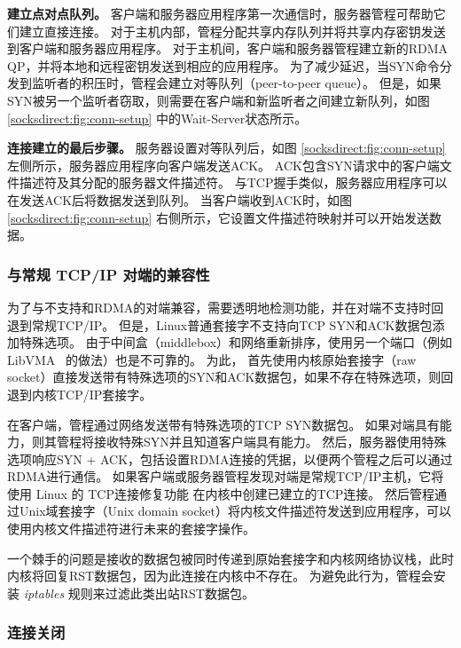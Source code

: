 \textbf {建立点对点队列。}
客户端和服务器应用程序第一次通信时，服务器管程可帮助它们建立直接连接。
对于主机内部，管程分配共享内存队列并将共享内存密钥发送到客户端和服务器应用程序。
对于主机间，客户端和服务器管程建立新的RDMA QP，并将本地和远程密钥发送到相应的应用程序。
为了减少延迟，当SYN命令分发到监听者的积压时，管程会建立对等队列（peer-to-peer queue）。
但是，如果SYN被另一个监听者窃取，则需要在客户端和新监听者之间建立新队列，如图 \ref {socksdirect:fig:conn-setup} 中的Wait-Server状态所示。

\textbf {连接建立的最后步骤。}
服务器设置对等队列后，如图 \ref {socksdirect:fig:conn-setup} 左侧所示，服务器应用程序向客户端发送ACK。 ACK包含SYN请求中的客户端文件描述符及其分配的服务器文件描述符。
与TCP握手类似，服务器应用程序可以在发送ACK后将数据发送到队列。
当客户端收到ACK时，如图 \ref {socksdirect:fig:conn-setup} 右侧所示，它设置文件描述符映射并可以开始发送数据。


\subsubsection{与常规 TCP/IP 对端的兼容性}


为了与不支持\sys {}和RDMA的对端兼容，\sys{}需要透明地检测\sys{}功能，并在对端不支持时回退到常规TCP/IP。
但是，Linux普通套接字不支持向TCP SYN和ACK数据包添加特殊选项。
由于中间盒（middlebox）和网络重新排序，使用另一个端口（例如LibVMA~ \cite {libvma} 的做法）也是不可靠的。
为此，\libipc{} 首先使用内核原始套接字（raw socket）直接发送带有特殊选项的SYN和ACK数据包，如果不存在特殊选项，则回退到内核TCP/IP套接字。

在客户端，管程通过网络发送带有特殊选项的TCP SYN数据包。
如果对端具有\sys {}能力，则其管程将接收特殊SYN并且知道客户端具有\sys {}能力。
然后，服务器使用特殊选项响应SYN + ACK，包括设置RDMA连接的凭据，以便两个管程之后可以通过RDMA进行通信。
如果客户端或服务器管程发现对端是常规TCP/IP主机，它将使用 Linux 的 TCP连接修复功能 \cite {tcp-connection-repair} 在内核中创建已建立的TCP连接。
然后管程通过Unix域套接字（Unix domain socket）将内核文件描述符发送到应用程序，\libipc {}可以使用内核文件描述符进行未来的套接字操作。


一个棘手的问题是接收的数据包被同时传递到原始套接字和内核网络协议栈，此时内核将回复RST数据包，因为此连接在内核中不存在。
为避免此行为，管程会安装 \emph {iptables} 规则来过滤此类出站RST数据包。



\subsubsection{连接关闭}



